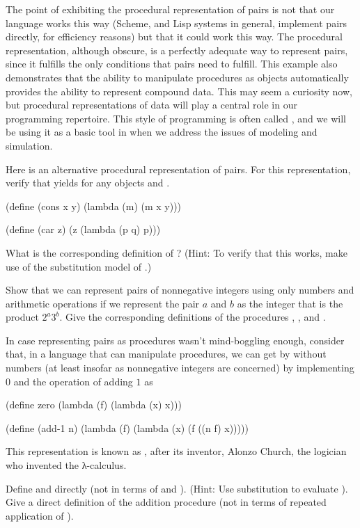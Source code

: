The point of exhibiting the procedural representation of pairs is not that our language works this way (Scheme, and Lisp systems in general, implement pairs directly, for efficiency reasons) but that it could work this way.
The procedural representation, although obscure, is a perfectly adequate way to represent pairs, since it fulfills the only conditions that pairs need to fulfill.
This example also demonstrates that the ability to manipulate procedures as objects automatically provides the ability to represent compound data.
This may seem a curiosity now, but procedural representations of data will play a central role in our programming repertoire.
This style of programming is often called , and we will be using it as a basic tool in  when we address the issues of modeling and simulation.



\begin{exercise}
	\label{Exercise 2.4}
	Here is an alternative procedural representation of pairs.
	For this representation, verify that  yields  for any objects  and .
	\begin{scheme}
	  (define (cons x y)
	    (lambda (m) (m x y)))

	  (define (car z)
	    (z (lambda (p q) p)))
	\end{scheme}
	What is the corresponding definition of ?
	(Hint:
	To verify that this works, make use of the substitution model of .)
\end{exercise}



\begin{exercise}
	\label{Exercise 2.5}
	Show that we can represent pairs of nonnegative integers using only numbers and arithmetic operations if we represent the pair \( a \) and \( b \) as the integer that is the product \( 2^a 3^b \).
	Give the corresponding definitions of the procedures , , and .
\end{exercise}



\begin{exercise}
	\label{Exercise 2.6}
	In case representing pairs as procedures wasn’t mind-boggling enough, consider that, in a language that can manipulate procedures, we can get by without numbers (at least insofar as nonnegative integers are concerned) by implementing \( 0 \) and the operation of adding \( 1 \) as
	\begin{scheme}
	  (define zero (lambda (f) (lambda (x) x)))

	  (define (add-1 n)
	    (lambda (f) (lambda (x) (f ((n f) x)))))
	\end{scheme}
	This representation is known as , after its inventor, Alonzo Church, the logician who invented the λ-calculus.

	Define  and  directly (not in terms of  and ).
	(Hint:
	Use substitution to evaluate ).
	Give a direct definition of the addition procedure \code{+} (not in terms of repeated application of ).
\end{exercise}
